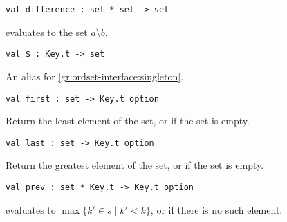 \begin{cluster}
\label{grp:grm:ordset-interface::difference}

\begin{gram}[difference]
\label{grm:ordset-interface::difference}
\begin{verbatim}
val difference : set * set -> set
\end{verbatim}
 evaluates to the set $a \setminus b$.

\end{gram}
\end{cluster}

\begin{cluster}
\label{grp:grm:ordset-interface::alias}

\begin{gram}[\$]
\label{grm:ordset-interface::alias}
\begin{verbatim}
val $ : Key.t -> set
\end{verbatim}
An alias for \ref{gr:ordset-interface:singleton}.

\end{gram}
\end{cluster}

\begin{cluster}
\label{grp:grm:ordset-interface::first}

\begin{gram}[first]
\label{grm:ordset-interface::first}
\begin{verbatim}
val first : set -> Key.t option
\end{verbatim}
Return the least element of the set, or  if the set is empty.

\end{gram}
\end{cluster}

\begin{cluster}
\label{grp:grm:ordset-interface::last}

\begin{gram}[last]
\label{grm:ordset-interface::last}
\begin{verbatim}
val last : set -> Key.t option
\end{verbatim}
Return the greatest element of the set, or  if the set is empty.

\end{gram}
\end{cluster}

\begin{cluster}
\label{grp:grm:ordset-interface::prev}

\begin{gram}[prev]
\label{grm:ordset-interface::prev}
\begin{verbatim}
val prev : set * Key.t -> Key.t option
\end{verbatim}
 evaluates to $\max \{ k' \in s \mathbin| k' < k \}$, or
 if there is no such element.

\end{gram}
\end{cluster}

